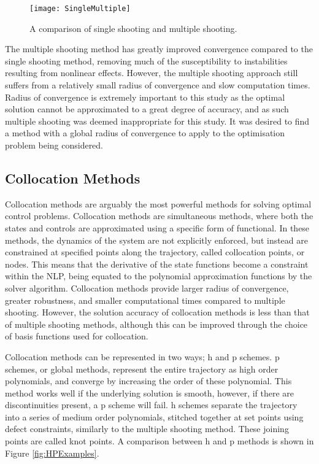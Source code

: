 \begin{figure}[ht]
	\centering
	\texttt{[image: SingleMultiple]}
	\caption{A comparison of single shooting and multiple shooting\cite{Kelly2015}.}
	\label{fig:multipleshooting}
\end{figure}

The multiple shooting method has greatly improved convergence compared to the single shooting method, removing much of the susceptibility to instabilities resulting from nonlinear effects. However, the multiple shooting approach still suffers from a relatively small radius of convergence and slow computation times\cite{Fasano2013}. Radius of convergence is extremely important to this study as the optimal solution cannot be approximated to a great degree of accuracy, and as such multiple shooting was deemed inappropriate for this study. It was desired to find a method with a global radius of convergence to apply to the optimisation problem being considered.

\subsection{Collocation Methods}

Collocation methods are arguably the most powerful methods for solving optimal control problems\cite{Rao2009}. Collocation methods are simultaneous methods, where both the states and controls are approximated using a specific form of functional\cite{Kelly2015,Rao2009}. In these methods, the dynamics of the system are not explicitly enforced, but instead are constrained at specified points along the trajectory, called collocation points, or nodes\cite{Kelly2015}. This means that the derivative of the state functions become a constraint within the NLP, being equated to the polynomial approximation functions by the solver algorithm. 
Collocation methods provide larger radius of convergence, greater robustness, and smaller computational times compared to multiple shooting\cite{Fasano2013}. However, the solution accuracy of collocation methods is less than that of multiple shooting methods\cite{Fasano2013}, although this can be improved through the choice of basis functions used for collocation\cite{Rao2009}.

Collocation methods can be represented in two ways; \textsf{h} and \textsf{p} schemes\cite{Kelly2015}. \textsf{p} schemes, or global methods, represent the entire trajectory as high order polynomials, and converge by increasing the order of these polynomial\cite{Kelly2015}. This method works well if the underlying solution is smooth, however, if there are discontinuities present, a \textsf{p} scheme will fail\cite{Kelly2015}. \textsf{h} schemes separate the trajectory into a series of medium order polynomials, stitched together at set points using defect constraints, similarly to the multiple shooting method\cite{Kelly2015,Rao2009,Ross2004}. These joining points are called knot points\cite{Kelly2015,Ross2004}. A comparison between \textsf{h} and \textsf{p} methods is shown in Figure \ref{fig:HPExamples}.

